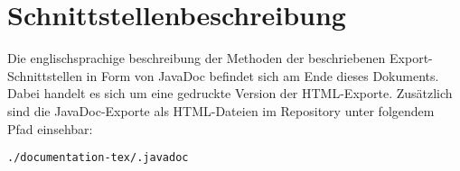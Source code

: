\section{Schnittstellenbeschreibung}\label{sec:schnittstellenbeschreibung}

Die englischsprachige beschreibung der Methoden der beschriebenen Export-Schnittstellen in Form von JavaDoc befindet sich am Ende dieses Dokuments.
Dabei handelt es sich um eine gedruckte Version der HTML-Exporte.
Zus\"atzlich sind die JavaDoc-Exporte als HTML-Dateien im Repository unter folgendem Pfad einsehbar:

\texttt{./documentation-tex/.javadoc}
